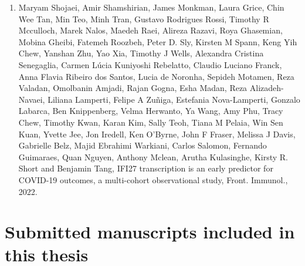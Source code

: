\begin{instructional}
\begin{enumerate}
        \item Maryam Shojaei, Amir Shamshirian, James Monkman, Laura Grice, Chin Wee Tan, Min Teo, Minh Tran, Gustavo Rodrigues Rossi, Timothy R Mcculloch, Marek Nalos, Maedeh Raei, Alireza Razavi, Roya Ghasemian, Mobina Gheibi, Fatemeh Roozbeh, Peter D. Sly, Kirsten M Spann, Keng Yih Chew, Yanshan Zhu, Yao Xia, Timothy J Wells, Alexandra Cristina Senegaglia, Carmen Lúcia Kuniyoshi Rebelatto, Claudio Luciano Franck, Anna Flavia Ribeiro dos Santos, Lucia de Noronha, Sepideh Motamen, Reza Valadan, Omolbanin Amjadi, Rajan Gogna, Esha Madan, Reza Alizadeh-Navaei, Liliana Lamperti, Felipe A Zuñiga, Estefania Nova-Lamperti, Gonzalo Labarca, Ben Knippenberg, Velma Herwanto, Ya Wang, Amy Phu, Tracy Chew, Timothy Kwan, Karan Kim, Sally Teoh, Tiana M Pelaia, Win Sen Kuan, Yvette Jee, Jon Iredell, Ken O'Byrne, John F Fraser, Melissa J Davis, Gabrielle Belz, Majid Ebrahimi Warkiani, Carlos Salomon, Fernando Guimaraes, Quan Nguyen, Anthony Mclean, Arutha Kulasinghe, Kirsty R. Short and Benjamin Tang, IFI27 transcription is an early predictor for COVID-19 outcomes, a multi-cohort observational study, Front. Immunol., 2022.
    \end{enumerate}
	
\end{instructional}





\section*{Submitted manuscripts included in this thesis}

